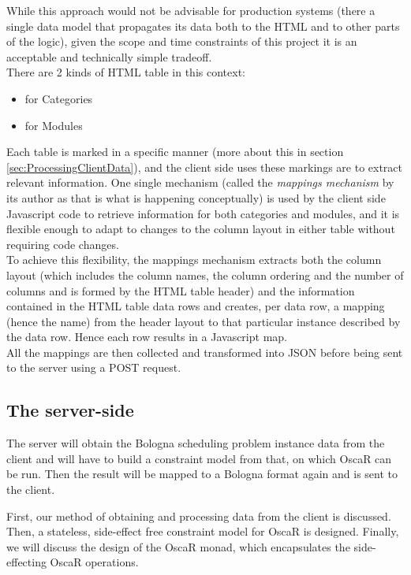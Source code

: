 \documentclass[a4paper]{article}
\begin{document}
While this approach would not be advisable for production systems
(there a single data model that propagates its data both to the HTML
and to other parts of the logic), given the scope and time constraints
of this project it is an acceptable and technically simple tradeoff.\\

There are 2 kinds of HTML table in this context:
\begin{itemize}
\item for Categories
\item for Modules
\end{itemize}

Each table is marked in a specific manner (more about this in section
\ref{sec:ProcessingClientData}), and the client side uses these
markings are to extract relevant information.
One single mechanism (called the \textit{mappings mechanism} by its
author as that is what is happening conceptually) is used by the
client side Javascript code to retrieve information for both
categories and modules, and it is flexible enough to adapt to changes
to the column layout in either table without requiring code changes.\\

To achieve this flexibility, the mappings mechanism extracts both the
column layout (which includes the column names, the column ordering
and the number of columns and is formed by the HTML table header) and
the information contained in the HTML table data rows and creates,
per data row, a mapping (hence the name) from the header layout to
that particular instance described by the data row. Hence each row
results in a Javascript map.\\

All the mappings are then collected and transformed into JSON before
being sent to the server using a POST request.


\subsection{The server-side}
\label{sec:design-server}
The server will obtain the Bologna scheduling problem instance data from the client
and will have to build a constraint model from that, on which OscaR can be run.
Then the result will be mapped to a Bologna format again and is sent to the client.

First, our method of obtaining and processing data from the client is discussed.
Then, a stateless, side-effect free constraint model for OscaR is designed.
Finally, we will discuss the design of the OscaR monad, 
which encapsulates the side-effecting OscaR operations.
\end{document}
